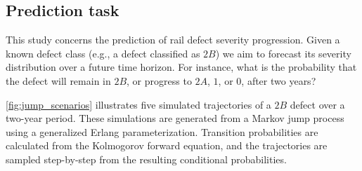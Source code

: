 \documentclass{article}
\begin{document}


\subsection{Prediction task} \label{sec:prediction_task}
This study concerns the prediction of rail defect severity progression. Given a known defect class (e.g., a defect classified as $2B$) we aim to forecast its severity distribution over a future time horizon. For instance, what is the probability that the defect will remain in $2B$, or progress to $2A$, $1$, or $0$, after two years?

\cref{fig:jump_scenarios} illustrates five simulated trajectories of a $2B$ defect over a two-year period. These simulations are generated from a Markov jump process using a generalized Erlang parameterization. Transition probabilities are calculated from the Kolmogorov forward equation, and the trajectories are sampled step-by-step from the resulting conditional probabilities.
\end{document}
